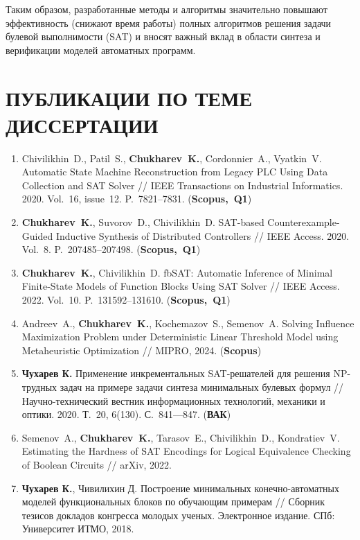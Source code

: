 Таким образом, разработанные методы и алгоритмы значительно повышают эффективность (снижают время работы) полных алгоритмов решения задачи булевой выполнимости (SAT) и вносят важный вклад в области синтеза и верификации моделей автоматных программ.


\section*{ПУБЛИКАЦИИ ПО ТЕМЕ ДИССЕРТАЦИИ}

\begin{enumerate}[left=0pt, beginpenalty=10000]
    \item Chivilikhin~D., Patil~S., \textbf{Chukharev~K.}, Cordonnier~A., Vyatkin~V. Automatic State Machine Reconstruction from Legacy PLC Using Data Collection and SAT Solver // IEEE Transactions on Industrial Informatics. 2020. Vol.~16, issue~12. P.~7821–7831. (\textbf{Scopus,~Q1})
    \item \textbf{Chukharev~K.}, Suvorov~D., Chivilikhin~D. SAT-based Counterexample-Guided Inductive Synthesis of Distributed Controllers // IEEE Access. 2020. Vol.~8. P.~207485–207498. (\textbf{Scopus,~Q1})
    \item \textbf{Chukharev~K.}, Chivilikhin~D. fbSAT: Automatic Inference of Minimal Finite-State Models of Function Blocks Using SAT Solver // IEEE Access. 2022. Vol.~10. P.~131592–131610. (\textbf{Scopus,~Q1})
    \item Andreev~A., \textbf{Chukharev~K.}, Kochemazov~S., Semenov~A. Solving Influence Maximization Problem under Deterministic Linear Threshold Model using Metaheuristic Optimization // MIPRO, 2024. (\textbf{Scopus})
    \item \textbf{Чухарев К.} Применение инкрементальных SAT-решателей для решения NP-трудных задач на примере задачи синтеза минимальных булевых формул // Научно-технический вестник информационных технологий, механики и оптики. 2020. Т.~20, 6(130). С.~841—847. (\textbf{ВАК})
    \item Semenov~A., \textbf{Chukharev~K.}, Tarasov~E., Chivilikhin~D., Kondratiev~V. Estimating the Hardness of SAT Encodings for Logical Equivalence Checking of Boolean Circuits // arXiv, 2022.
    \item \textbf{Чухарев К.}, Чивилихин Д. Построение минимальных конечно-автоматных моделей функциональных блоков по обучающим примерам // Сборник тезисов докладов конгресса молодых ученых. Электронное издание. СПб: Университет ИТМО, 2018.

\end{enumerate}
